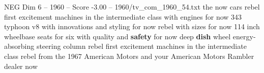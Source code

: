 \begin{textsample}{NEG Dim 6 – 1960 – Score -3.00 – 1960/tv\_com\_1960\_54.txt}  \label{ex:f6_neg_072}
the now cars rebel first excitement machines in the intermediate class with engines for now 343 typhoon v8 with innovations and styling for now rebel with sizes for now 114 inch wheelbase seats for six with quality and \textbf{safety} for now deep \textbf{dish} wheel energy-absorbing steering column rebel first excitement machines in the intermediate class rebel from the 1967 American Motors and your American Motors Rambler dealer now

\end{textsample}
